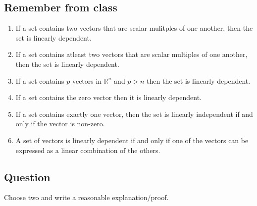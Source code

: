 \documentclass{article}
\begin{document}
        \subsection{Remember from class}
            \begin{enumerate}
                \item 
                    If a set contains two vectors that are scalar
                    mulitples of one another, then the set 
                    is linearly dependent.
                \item 
                    If a set contains atleast two vectors that are
                    scalar multiples of one another, then the set is linearly dependent.
                \item    
                    If a set contains $p$ vectors in $\mathbb{R}^n$ 
                    and $p > n$
                    then the set is linearly dependent.
                \item
                    If a set contains the zero vector then it is linearly dependent.
                \item 
                    If a set contains exactly one vector, then the set is linearly independent
                    if and only if the vector is non-zero.
                \item 
                    A set of vectors is linearly dependent if and only if
                    one of the vectors can be expressed as a linear combination of the others.
            \end{enumerate}
        \subsection{Question}
            Choose two and write a reasonable explanation/proof.
\end{document}
